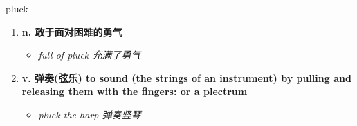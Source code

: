 
\begin{frame}
{\huge pluck}
\begin{center}
\begin{enumerate}\Large
  \item \textbf{n. 敢于面对困难的勇气}
  \begin{itemize}
    \item \em{\Large{full of pluck 充满了勇气}}
  \end{itemize}
  \item \textbf{v. 弹奏(弦乐) to sound (the strings of an instrument) by pulling and releasing them with the fingers: or a plectrum}
  \begin{itemize}
    \item \em{\Large{pluck the harp 弹奏竖琴}}
  \end{itemize}
\end{enumerate}
\end{center}
\end{frame}
